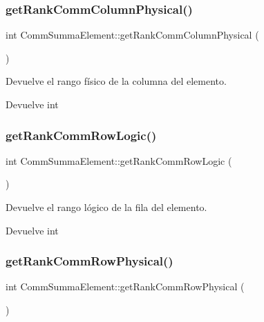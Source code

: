 \subsubsection{\texorpdfstring{get\+Rank\+Comm\+Column\+Physical()}{getRankCommColumnPhysical()}}
{\footnotesize\ttfamily int Comm\+Summa\+Element\+::get\+Rank\+Comm\+Column\+Physical (\begin{DoxyParamCaption}{ }\end{DoxyParamCaption})}



Devuelve el rango físico de la columna del elemento. 

\begin{DoxyReturn}{Devuelve}
int 
\end{DoxyReturn}
\mbox{\label{classCommSummaElement_a6fbf409dcbcc262bdc3d9cddc85b821c}} 
\subsubsection{\texorpdfstring{get\+Rank\+Comm\+Row\+Logic()}{getRankCommRowLogic()}}
{\footnotesize\ttfamily int Comm\+Summa\+Element\+::get\+Rank\+Comm\+Row\+Logic (\begin{DoxyParamCaption}{ }\end{DoxyParamCaption})}



Devuelve el rango lógico de la fila del elemento. 

\begin{DoxyReturn}{Devuelve}
int 
\end{DoxyReturn}
\mbox{\label{classCommSummaElement_a8e621902bac457bd3e476967a9aa25f0}} 
\subsubsection{\texorpdfstring{get\+Rank\+Comm\+Row\+Physical()}{getRankCommRowPhysical()}}
{\footnotesize\ttfamily int Comm\+Summa\+Element\+::get\+Rank\+Comm\+Row\+Physical (\begin{DoxyParamCaption}{ }\end{DoxyParamCaption})}



